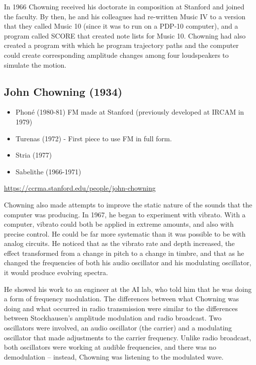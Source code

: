 In 1966 Chowning received his doctorate in composition at Stanford and joined the faculty. By then, he and his colleagues had re-written Music IV to a version that they called Music 10 (since it was to run on a PDP-10 computer), and a program called SCORE that created note lists for Music 10. Chowning had also created a program with which he program trajectory paths and the computer could create corresponding amplitude changes among four loudspeakers to simulate the motion.

\subsection{John Chowning (1934)}
\begin{itemize}
\item Phon\'e (1980-81) FM made at Stanford (previously developed at IRCAM in 1979)
\item Turenas (1972) - First piece to use FM in full form.
\item Stria (1977) 
\item Sabelithe (1966-1971)
\end{itemize}

\url{https://ccrma.stanford.edu/people/john-chowning}

Chowning also made attempts to improve the static nature of the sounds that the computer was producing. In 1967, he began to experiment with vibrato. With a computer, vibrato could both be applied in extreme amounts, and also with precise control. He could be far more systematic than it was possible to be with analog circuits. He noticed that as the vibrato rate and depth increased, the effect transformed from a change in pitch to a change in timbre, and that as he changed the frequencies of both his audio oscillator and his modulating oscillator, it would produce evolving spectra.

He showed his work to an engineer at the AI lab, who told him that he was doing a form of frequency modulation. The differences between what Chowning was doing and what occurred in radio transmission were similar to the differences between Stockhausen's amplitude modulation and radio broadcast. Two oscillators were involved, an audio oscillator (the carrier) and a modulating oscillator that made adjustments to the carrier frequency. Unlike radio broadcast, both oscillators were working at audible frequencies, and there was no demodulation -- instead, Chowning was listening to the modulated wave.

